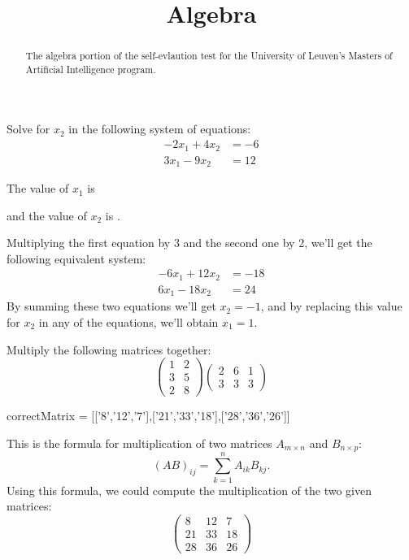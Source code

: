 \documentclass{ximera}
\title{Algebra}
\begin{document}
\begin{abstract}
The algebra portion of the self-evlaution test for the University
of Leuven's Masters of Artificial Intelligence program.
\end{abstract}
\maketitle

\begin{question}
Solve for $x_2$ in the following system of equations:
\begin{align*}
-2x_1 + 4x_2 &= -6\\
3x_1  - 9x_2 &=  12 
\end{align*}
\begin{solution}
The value of $x_1$ is 
\end{solution}
\begin{solution}
and the value of $x_2$ is .
\end{solution}
Multiplying the first equation by 3 and the second one by 2, we'll get the following equivalent system:
\begin{align*}
 -6  x_1  + 12  x_2 &= -18 \\
 6  x_1  - 18  x_2 &= 24
\end{align*}
By summing these two equations we'll get $x_2 = -1$, and by replacing
this value for $x_2$ in any of the equations, we'll obtain $x_1 = 1$.
\end{question}

\begin{question}
Multiply the following matrices together:
\[ 
\left( \begin{array}{cc}
1 & 2 \\
3 & 5 \\
2 & 8
\end{array} \right)
\left( \begin{array}{ccc}
2 & 6 & 1 \\
3 & 3 & 3
\end{array} \right)
\]
\begin{solution}
\begin{matrix-answer}[name=M]
    correctMatrix = [['8','12','7'],['21','33','18'],['28','36','26']]
\end{matrix-answer}
\end{solution}
This is the formula for multiplication of two matrices $A_{m \times n}$ and $B_{n \times p}$:
\[
    (AB)_{ij} = \sum_{k=1}^n A_{ik}B_{kj}. 
\]
Using this formula, we could compute the multiplication of the two given matrices:
\[
\begin{pmatrix}
8 & 12 & 7 \\
21 & 33 & 18 \\
28 & 36 & 26
\end{pmatrix}
\]
\end{question}
\end{document}
